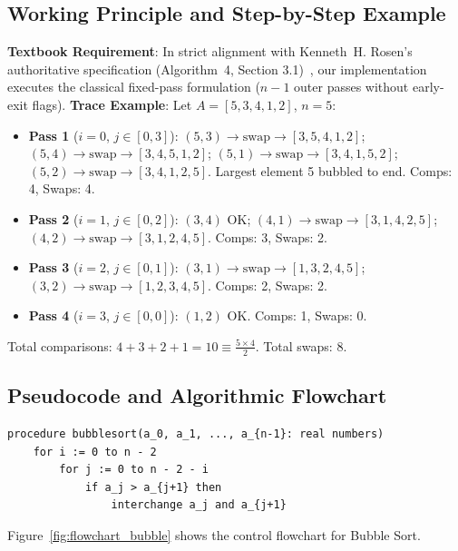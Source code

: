 \documentclass[11pt,a4paper,oneside]{report}
\theoremstyle{definition}
\begin{document}
\subsection{Working Principle and Step-by-Step Example}
\textbf{Textbook Requirement}: In strict alignment with Kenneth~H. Rosen's authoritative specification (Algorithm~4, Section 3.1)~\cite{Rosen2019}, our implementation executes the classical fixed-pass formulation ($n-1$ outer passes without early-exit flags).
\textbf{Trace Example}: Let $A = [5, 3, 4, 1, 2]$, $n = 5$:
\begin{itemize}
    \item \textbf{Pass 1} ($i = 0$, $j \in [0, 3]$):
      $(5, 3) \to \text{swap} \to [3, 5, 4, 1, 2]$;
      $(5, 4) \to \text{swap} \to [3, 4, 5, 1, 2]$;
      $(5, 1) \to \text{swap} \to [3, 4, 1, 5, 2]$;
      $(5, 2) \to \text{swap} \to [3, 4, 1, 2, 5]$. Largest element 5 bubbled to end. Comps: 4, Swaps: 4.
    \item \textbf{Pass 2} ($i = 1$, $j \in [0, 2]$):
      $(3, 4)$ OK;
      $(4, 1) \to \text{swap} \to [3, 1, 4, 2, 5]$;
      $(4, 2) \to \text{swap} \to [3, 1, 2, 4, 5]$. Comps: 3, Swaps: 2.
    \item \textbf{Pass 3} ($i = 2$, $j \in [0, 1]$):
      $(3, 1) \to \text{swap} \to [1, 3, 2, 4, 5]$;
      $(3, 2) \to \text{swap} \to [1, 2, 3, 4, 5]$. Comps: 2, Swaps: 2.
    \item \textbf{Pass 4} ($i = 3$, $j \in [0, 0]$):
      $(1, 2)$ OK. Comps: 1, Swaps: 0.
\end{itemize}
Total comparisons: $4 + 3 + 2 + 1 = 10 \equiv \frac{5 \times 4}{2}$. Total swaps: 8.

\subsection{Pseudocode and Algorithmic Flowchart}
\begin{lstlisting}[caption={Pseudocode: Bubble Sort (Rosen \S3.1, Algorithm 4)}]
procedure bubblesort(a_0, a_1, ..., a_{n-1}: real numbers)
    for i := 0 to n - 2
        for j := 0 to n - 2 - i
            if a_j > a_{j+1} then
                interchange a_j and a_{j+1}
\end{lstlisting}

Figure~\ref{fig:flowchart_bubble} shows the control flowchart for Bubble Sort.
\end{document}
